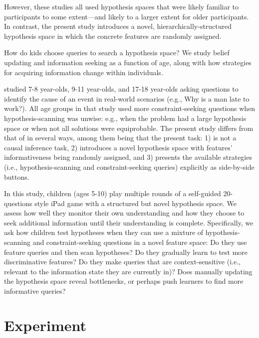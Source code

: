 \documentclass[10pt,letterpaper]{article}
\begin{document}
However, these studies all used hypothesis spaces that were likely familiar to participants to some extent---and likely to a larger extent for older participants. 
In contrast, the present study introduces a novel, hierarchically-structured hypothesis space in which the concrete features are randomly assigned. 


How do kids choose queries to search a hypothesis space? We study belief updating and information seeking as a function of age, along with how strategies for acquiring information change within individuals.

  studied 7-8 year-olds, 9-11 year-olds, and 17-18 year-olds asking questions to identify the cause of an event in real-world scenarios (e.g., Why is a man late to work?). All age groups in that study used more constraint-seeking questions when hypothesis-scanning was unwise: e.g., when the problem had a large hypothesis space or when not all solutions were equiprobable. The present study differs from that of  in several ways, among them being that the present task: 1) is not a causal inference task, 2) introduces a novel hypothesis space with features' informativeness being randomly assigned, and 3) presents the available strategies (i.e., hypothesis-scanning and constraint-seeking queries) explicitly as side-by-side buttons.

In this study, children (ages 5-10) play multiple rounds of a self-guided 20-questions style iPad game with a structured but novel hypothesis space. We assess how well they monitor their own understanding and how they choose to seek additional information until their understanding is complete. Specifically, we ask how children test hypotheses when they can use a mixture of hypothesis-scanning and constraint-seeking questions in a novel feature space: Do they use feature queries and then scan hypotheses? Do they gradually learn to test more discriminative features? Do they make queries that are context-sensitive (i.e., relevant to the information state they are currently in)? Does manually updating the hypothesis space reveal bottlenecks, or perhaps push learners to find more informative queries?


\section{Experiment}
\end{document}

